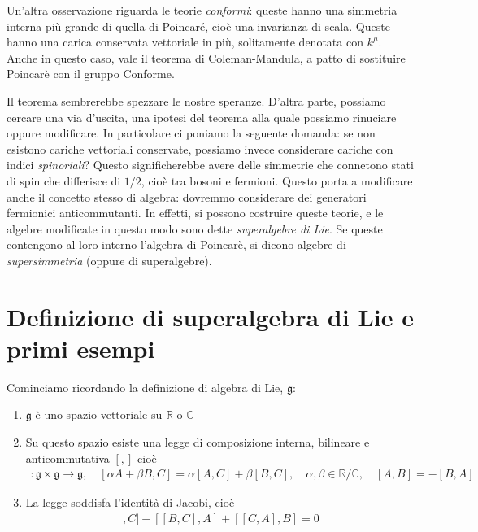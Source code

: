 \documentclass{report}
\begin{document}
Un'altra osservazione riguarda le teorie \emph{conformi}: queste hanno una simmetria interna più grande di quella di Poincaré, cioè una invarianza di scala. Queste hanno una carica conservata vettoriale in più, solitamente denotata con \(k^\mu\). Anche in questo caso, vale il teorema di Coleman-Mandula, a patto di sostituire Poincarè con il gruppo Conforme. 

Il teorema sembrerebbe spezzare le nostre speranze. D'altra parte, possiamo cercare una via d'uscita, una ipotesi del teorema alla quale possiamo rinuciare oppure modificare. In particolare ci poniamo la seguente domanda: se non esistono cariche vettoriali conservate, possiamo invece considerare cariche con indici \emph{spinoriali}? Questo significherebbe avere delle simmetrie che connetono stati di spin che differisce di \(1/2\), cioè tra bosoni e fermioni. Questo porta a modificare anche il concetto stesso di algebra: dovremmo considerare dei generatori fermionici anticommutanti. In effetti, si possono costruire queste teorie, e le algebre modificate in questo modo sono dette \emph{superalgebre di Lie}. Se queste contengono al loro interno l'algebra di Poincarè, si dicono algebre di \emph{supersimmetria} (oppure di superalgebre). 

\section{Definizione di superalgebra di Lie e primi esempi}

Cominciamo ricordando la definizione di algebra di Lie, \(\mathfrak{g}\): 

\begin{enumerate}
    \item \(\mathfrak{g}\) è uno spazio vettoriale su \(\mathbb{R}\) o \(\mathbb{C}\)
    \item Su questo spazio esiste una legge di composizione interna, bilineare e anticommutativa \([,]\) cioè 
    \begin{align}
        [, ] : \mathfrak{g} \times \mathfrak{g} \to \mathfrak{g}, \quad [\alpha A +\beta B, C] = \alpha [A, C] + \beta [B, C], \quad \alpha, \beta \in \mathbb{R}/\mathbb{C}, \quad [A, B] = -[B, A]
    \end{align}
    \item La legge soddisfa l'identità di Jacobi, cioè 
    \begin{align}
        [[A, B], C] + [[B, C], A] + [[C, A], B] = 0 
    \end{align}
\end{enumerate}
\end{document}
